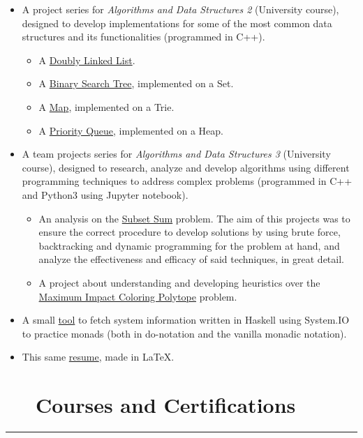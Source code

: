 \documentclass{article}
\begin{document}
\begin{itemize}
    \item A project series for \textit{Algorithms and Data Structures 2} (University course), designed to develop implementations for some of the most common data structures and its functionalities (programmed in C++).
    \begin{itemize}
        \item A \href{https://github.com/lucasDS-0/Doubly_Linked_List}{Doubly Linked List}.
        \item A \href{https://github.com/lucasDS-0/BST_on_a_set}{Binary Search Tree}, implemented on a Set.
        \item A \href{https://github.com/lucasDS-0/Map_on_a_trie}{Map}, implemented on a Trie.
        \item A \href{https://github.com/lucasDS-0/Priority_queue_on_a_heap}{Priority Queue}, implemented on a Heap.
    \end{itemize}
    \item A team projects series for \textit{Algorithms and Data Structures 3} (University course), designed to research, analyze and develop algorithms using different programming techniques to address complex problems (programmed in C++ and Python3 using Jupyter notebook).
    \begin{itemize}
        \item An analysis on the \href{https://github.com/lucasDS-0/Subset_sum}{Subset Sum} problem. The aim of this projects was to ensure the correct procedure to develop solutions by using brute force, backtracking and dynamic programming for the problem at hand, and analyze the effectiveness and efficacy of said techniques, in great detail.
        \item A project about understanding and developing heuristics over the \href{https://github.com/lucasDS-0/MIC_Polytope}{Maximum Impact Coloring Polytope} problem.
    \end{itemize}
        \item A small \href{https://github.com/lucasDS-0/hFetch}{tool} to fetch system information written in Haskell using System.IO to practice monads (both in do-notation and the vanilla monadic notation).
    \item This same \href{https://github.com/lucasDS-0/Resume}{resume}, made in \LaTeX.
\end{itemize}



\section*{\faLaptop ~~ Courses and Certifications} 
\hrule
\end{document}
